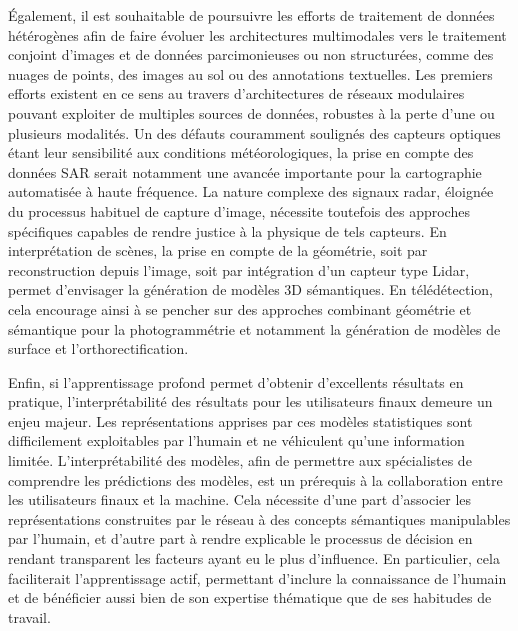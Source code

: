 Également, il est souhaitable de poursuivre les efforts de traitement de données hétérogènes afin de faire évoluer les architectures multimodales vers le traitement conjoint d'images et de données parcimonieuses ou non structurées, comme des nuages de points, des images au sol ou des annotations textuelles. Les premiers efforts existent en ce sens au travers d'architectures de réseaux modulaires pouvant exploiter de multiples sources de données, robustes à la perte d'une ou plusieurs modalités. Un des défauts couramment soulignés des capteurs optiques étant leur sensibilité aux conditions météorologiques, la prise en compte des données SAR serait notamment une avancée importante pour la cartographie automatisée à haute fréquence. La nature complexe des signaux radar, éloignée du processus habituel de capture d'image, nécessite toutefois des approches spécifiques capables de rendre justice à la physique de tels capteurs. En interprétation de scènes, la prise en compte de la géométrie, soit par reconstruction depuis l'image, soit par intégration d'un capteur type Lidar, permet d'envisager la génération de modèles 3D sémantiques. En télédétection, cela encourage ainsi à se pencher sur des approches combinant géométrie et sémantique pour la photogrammétrie et notamment la génération de modèles de surface et l'orthorectification.

Enfin, si l'apprentissage profond permet d'obtenir d'excellents résultats en pratique, l'interprétabilité des résultats pour les utilisateurs finaux demeure un enjeu majeur. Les représentations apprises par ces modèles statistiques sont difficilement exploitables par l'humain et ne véhiculent qu'une information limitée. L'interprétabilité des modèles, afin de permettre aux spécialistes de comprendre les prédictions des modèles, est un prérequis à la collaboration entre les utilisateurs finaux et la machine. Cela nécessite d'une part d'associer les représentations construites par le réseau à des concepts sémantiques manipulables par l'humain, et d'autre part à rendre explicable le processus de décision en rendant transparent les facteurs ayant eu le plus d'influence. En particulier, cela faciliterait l'apprentissage actif, permettant d'inclure la connaissance de l'humain et de bénéficier aussi bien de son expertise thématique que de ses habitudes de travail.

